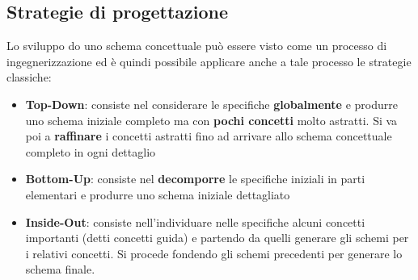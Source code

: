 \documentclass[a4paper]{article}
\begin{document}
\subsection{Strategie di progettazione}
Lo sviluppo do uno schema concettuale può essere visto come un processo di ingegnerizzazione
ed è quindi possibile applicare anche a tale processo le strategie classiche:
\begin{itemize}
  \item \textbf{Top-Down}: consiste nel considerare le specifiche \textbf{globalmente}
    e produrre uno schema iniziale completo ma con \textbf{pochi concetti} molto astratti.
    Si va poi a \textbf{raffinare} i concetti astratti fino ad arrivare allo schema
    concettuale completo in ogni dettaglio

  \item \textbf{Bottom-Up}: consiste nel \textbf{decomporre} le specifiche iniziali in
    parti elementari e produrre uno schema iniziale dettagliato

  \item \textbf{Inside-Out}: consiste nell'individuare nelle specifiche alcuni concetti
    importanti (detti concetti guida) e partendo da quelli generare gli schemi
    per i relativi concetti. Si procede fondendo gli schemi precedenti per generare
    lo schema finale.
\end{itemize}
\end{document}
